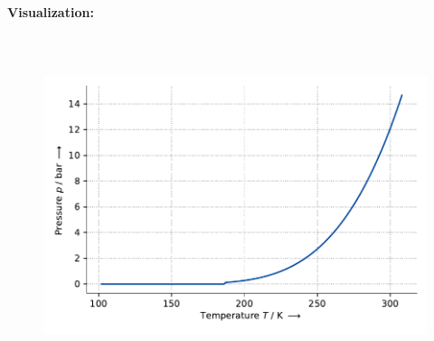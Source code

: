 \textbf{Visualization:}
%
\begin{figure}[!htp]
{\noindent\includegraphics[height=10cm, keepaspectratio]{figs/ref/ref_Propylene_VaporPressure_EoSCubic_1.pdf}}
\end{figure}
%

\FloatBarrier
\newpage
